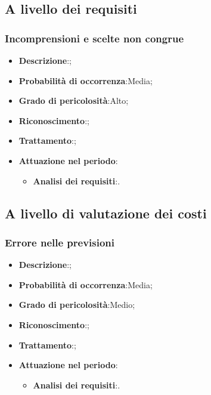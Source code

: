 	\subsection{A livello dei requisiti}
	
		\subsubsection{Incomprensioni e scelte non congrue}
		\begin{itemize}
			\item \textbf{Descrizione}:;
			\item \textbf{Probabilità di occorrenza}:Media;
			\item \textbf{Grado di pericolosità}:Alto;
			\item \textbf{Riconoscimento}:;	
			\item \textbf{Trattamento}:;
			\item \textbf{Attuazione nel periodo}:
			\begin{itemize}
				\item \textbf{Analisi dei requisiti}:.
			\end{itemize}
		\end{itemize}
	
	\subsection{A livello di valutazione dei costi}
	
		\subsubsection{Errore nelle previsioni}
		\begin{itemize} 
			\item \textbf{Descrizione}:;
			\item \textbf{Probabilità di occorrenza}:Media;
			\item \textbf{Grado di pericolosità}:Medio;
			\item \textbf{Riconoscimento}:;
			\item \textbf{Trattamento}:;
			\item \textbf{Attuazione nel periodo}:
			\begin{itemize}
				\item \textbf{Analisi dei requisiti}:.
			\end{itemize}
		\end{itemize}